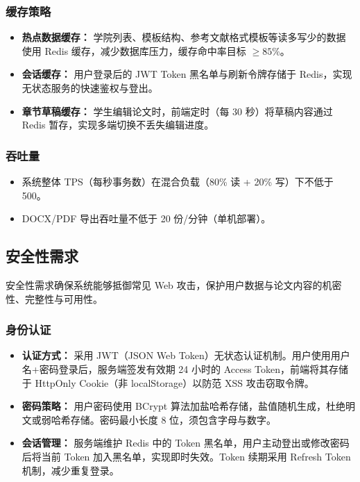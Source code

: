 \documentclass{../softeng}
\begin{document}
\subsubsection{缓存策略}

\begin{itemize}
    \item \textbf{热点数据缓存：} 学院列表、模板结构、参考文献格式模板等读多写少的数据使用 Redis 缓存，减少数据库压力，缓存命中率目标 $\ge 85\%$。
    \item \textbf{会话缓存：} 用户登录后的 JWT Token 黑名单与刷新令牌存储于 Redis，实现无状态服务的快速鉴权与登出。
    \item \textbf{章节草稿缓存：} 学生编辑论文时，前端定时（每 30 秒）将草稿内容通过 Redis 暂存，实现多端切换不丢失编辑进度。
\end{itemize}

\subsubsection{吞吐量}

\begin{itemize}
    \item 系统整体 TPS（每秒事务数）在混合负载（80\% 读 + 20\% 写）下不低于 500。
    \item DOCX/PDF 导出吞吐量不低于 20 份/分钟（单机部署）。
\end{itemize}

\subsection{安全性需求}

安全性需求确保系统能够抵御常见 Web 攻击，保护用户数据与论文内容的机密性、完整性与可用性。

\subsubsection{身份认证}

\begin{itemize}
    \item \textbf{认证方式：} 采用 JWT（JSON Web Token）无状态认证机制。用户使用用户名+密码登录后，服务端签发有效期 24 小时的 Access Token，前端将其存储于 HttpOnly Cookie（非 localStorage）以防范 XSS 攻击窃取令牌。
    \item \textbf{密码策略：} 用户密码使用 BCrypt 算法加盐哈希存储，盐值随机生成，杜绝明文或弱哈希存储。密码最小长度 8 位，须包含字母与数字。
    \item \textbf{会话管理：} 服务端维护 Redis 中的 Token 黑名单，用户主动登出或修改密码后将当前 Token 加入黑名单，实现即时失效。Token 续期采用 Refresh Token 机制，减少重复登录。
\end{itemize}
\end{document}
